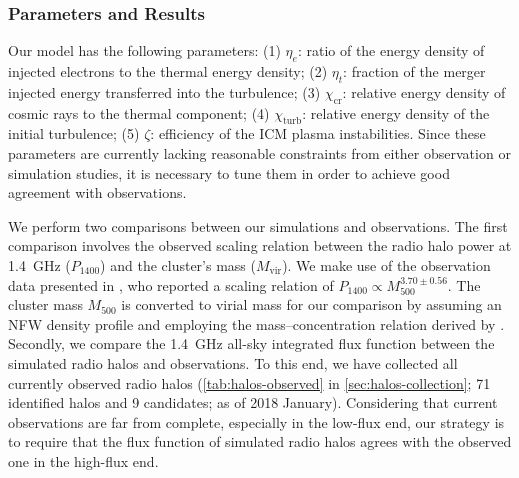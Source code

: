 \documentclass[twocolumn]{aastex62}
\newcommand{\R}[1]{\mathrm{#1}}
\newcommand{\editone}[1]{{\leavevmode\color{cyan}#1}}
\begin{document}
\subsubsection{\editone{Parameters and Results}}
\label{sec:halo-results}

Our model has the following parameters:
\editone{%
(1) $\eta_e$: ratio of the energy density of injected electrons to the
thermal energy density;
(2) $\eta_t$: fraction of the merger injected energy transferred into the
turbulence;
(3) $\chi_{\R{cr}}$: relative energy density of cosmic rays to the thermal
component;
(4) $\chi_{\R{turb}}$: relative energy density of the initial turbulence;
(5) $\zeta$: efficiency of the ICM plasma instabilities.
Since these parameters are currently lacking reasonable constraints from
either observation or simulation studies, it is necessary to tune them in
order to achieve good agreement with observations.} %

\editone{%
We perform two comparisons between our simulations and observations.
The first comparison involves the observed scaling relation between the
radio halo power at \SI{1.4}{\GHz} ($P_{1400}$) and the cluster's mass
($M_{\R{vir}}$).
We make use of the observation data presented in \citet{cassano2013},
who reported a scaling relation of
$P_{1400} \propto M_{500}^{3.70 \pm 0.56}$.
The cluster mass $M_{500}$ is converted to virial mass for our comparison
by assuming an NFW density profile \citep{navarro1997} and employing the
mass--concentration relation derived by \citet{duffy2008}.
Secondly,}
we compare the \SI{1.4}{\GHz} all-sky integrated flux function between
the simulated radio halos and observations.
To this end, we have collected all currently observed radio halos
(\autoref{tab:halos-observed} in \autoref{sec:halos-collection};
71 identified halos and 9 candidates; as of 2018 January).
Considering that current observations are far from complete,
especially in the low-flux end, our strategy is to require that the
flux function of simulated radio halos agrees with the
observed one in the high-flux end.
\end{document}
